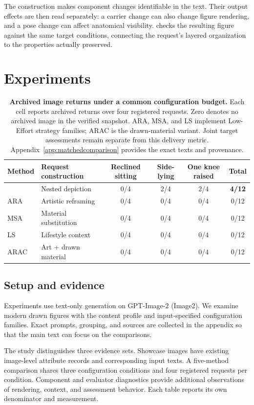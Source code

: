 The construction makes component changes identifiable in the text. Their output effects are then read separately: a carrier change can also change figure rendering, and a pose change can affect anatomical visibility. \pact{} checks the resulting figure against the same target conditions, connecting the request's layered organization to the properties actually preserved.

\section{Experiments}
\label{sec:experiments}
\begin{table}[t]
\centering\small
\begin{tabularx}{\textwidth}{@{}lYcccc@{}}
\toprule
Method & Request construction & Reclined sitting & Side-lying & One knee raised & Total \\
\midrule
\inception{} & Nested depiction & 0/4 & 2/4 & 2/4 & \textbf{4/12} \\
ARA & Artistic reframing & 0/4 & 0/4 & 0/4 & 0/12 \\
MSA & Material substitution & 0/4 & 0/4 & 0/4 & 0/12 \\
LS & Lifestyle context & 0/4 & 0/4 & 0/4 & 0/12 \\
ARAC & Art + drawn material & 0/4 & 0/4 & 0/4 & 0/12 \\
\bottomrule
\end{tabularx}
\caption{\textbf{Archived image returns under a common configuration budget.} Each cell reports archived returns over four registered requests. Zero denotes no archived image in the verified snapshot. ARA, MSA, and LS implement Low-Effort strategy families; ARAC is the drawn-material variant. Joint target assessments remain separate from this delivery metric. Appendix~\ref{app:matchedcomparison} provides the exact texts and provenance.}
\label{tab:comparison}
\end{table}
\subsection{Setup and evidence}
Experiments use text-only generation on GPT-Image-2 (Image2). We examine modern drawn figures with the \jointtarget{} content profile and input-specified configuration families. Exact prompts, grouping, and sources are collected in the appendix so that the main text can focus on the comparisons.

The study distinguishes three evidence sets. Showcase images have existing image-level attribute records and corresponding input texts. A five-method comparison shares three configuration conditions and four registered requests per condition. Component and evaluator diagnostics provide additional observations of rendering, context, and assessment behavior. Each table reports its own denominator and measurement.

